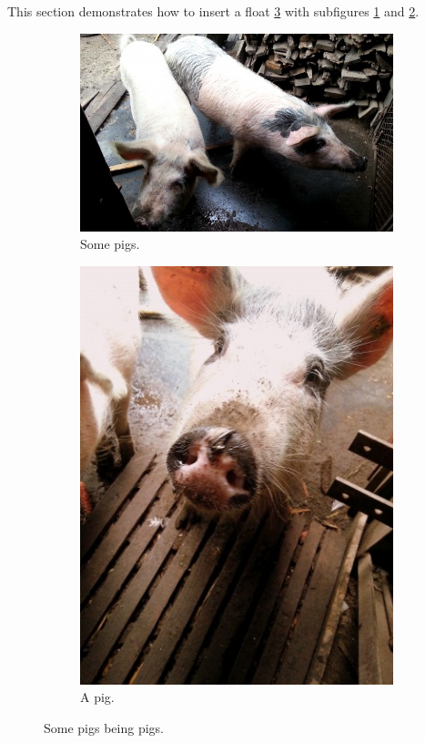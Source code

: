 This section demonstrates how to insert a float \ref{fig:subex} with subfigures \ref{fig:subex:pigs} and \ref{fig:subex:pig}.

\begin{figure}[!h]
  \centering
  \begin{subfigure}[b]{0.3\textwidth}
    \includegraphics[width=\textwidth]{static/img/pigs1.jpg}
    \caption{Some pigs.}
    \label{fig:subex:pigs}
  \end{subfigure}
  \begin{subfigure}[b]{0.3\textwidth}
    \includegraphics[width=\textwidth]{static/img/pigs2.jpg}
    \caption{A pig.}
    \label{fig:subex:pig}
  \end{subfigure}
  \caption{Some pigs being pigs.}
  \label{fig:subex}
\end{figure}